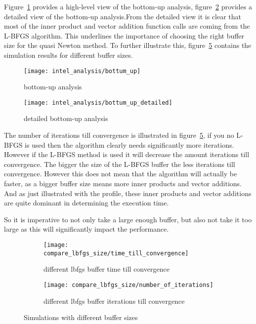 Figure~\ref{fig:bottom-up analysis} provides a high-level view of the bottom-up analysis, figure~\ref{fig:detailed bottom-up analysis} provides a detailed view of the bottom-up analysis.From the detailed view it is clear that most of the inner product and vector addition function calls are coming from the L-BFGS algorithm. This underlines the importance of choosing the right buffer size for the quasi Newton method. To further illustrate this, figure~\ref{fig:Simulations with different buffer sizes} contains the simulation results for different buffer sizes.

\begin{figure}[H]
	\centering
	\texttt{[image: intel\_analysis/bottum\_up]}
	\caption{bottom-up analysis}
	\label{fig:bottom-up analysis}
\end{figure}

\begin{figure}[H]
	\centering
	\texttt{[image: intel\_analysis/bottum\_up\_detailed]}
	\caption{detailed bottom-up analysis}
	\label{fig:detailed bottom-up analysis}
\end{figure}

The number of iterations till convergence is illustrated in figure~\ref{fig:Simulations with different buffer sizes}, if you no L-BFGS is used then the algorithm clearly needs significantly more iterations. However if the L-BFGS method is used it will decrease the amount iterations till convergence. The bigger the size of the L-BFGS buffer the less iterations till convergence. However this does not mean that the algorithm will actually be faster, as a bigger buffer size means more inner products and vector additions. And as just illustrated with the profile, these inner products and vector additions are quite dominant in determining the execution time.

So it is imperative to not only take a large enough buffer, but also not take it too large as this will significantly impact the performance.

\begin{figure}[H]
	\centering
	\begin{subfigure}[b]{0.45\textwidth}
		\centering
		\texttt{[image: compare\_lbfgs\_size/time\_till\_convergence]}
		\caption{different lbfgs buffer time till convergence}
		\label{fig:different lbfgs buffer time till convergence}
	\end{subfigure}
	\hfill
	\begin{subfigure}[b]{0.45\textwidth}
		\centering
		\texttt{[image: compare\_lbfgs\_size/number\_of\_iterations]}
		\caption{different lbfgs buffer iterations till convergence}
		\label{fig:different lbfgs buffer iterations till convergence}
	\end{subfigure}
	\caption{Simulations with different buffer sizes}
	\label{fig:Simulations with different buffer sizes}
\end{figure}

